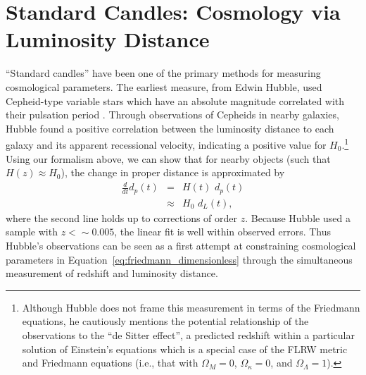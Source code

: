 \section{Standard Candles: Cosmology via Luminosity Distance}
\label{sec:std_candles}
``Standard candles'' have been one of the primary methods for measuring
cosmological parameters.  The earliest measure, from Edwin Hubble,
used Cepheid-type variable stars which have an absolute magnitude correlated
with their pulsation period \citep{hubble1929}.
Through observations of Cepheids
in nearby galaxies, Hubble found a positive correlation between the
luminosity distance to each galaxy and its apparent recessional velocity,
indicating a positive value for $H_0$.\footnote{
Although Hubble does not frame this measurement in terms of the Friedmann
equations, he cautiously mentions the potential relationship of the
observations to the ``de Sitter effect'', a predicted redshift within
a particular solution of
Einstein's equations which is a special case of the FLRW metric and
Friedmann equations (i.e., that with $\Omega_M = 0$, $\Omega_\kappa = 0$,
and $\Omega_\Lambda = 1$).}
Using our formalism above, we can show that for
nearby objects (such that $H(z) \approx H_0$),
the change in proper distance is approximated by
\begin{eqnarray}
  \frac{d}{dt}d_p(t) &=& H(t)\,\, d_p(t) \nonumber\\
                     &\approx& H_0\,\, d_L(t),
\end{eqnarray}
where the second line holds up to corrections of order $z$.  Because
Hubble used a sample with $z <\sim 0.005$, the linear fit is well within
observed errors.
Thus Hubble's observations can be seen as a first attempt at constraining
cosmological parameters in Equation~\ref{eq:friedmann_dimensionless} through
the simultaneous measurement of redshift and luminosity distance.

